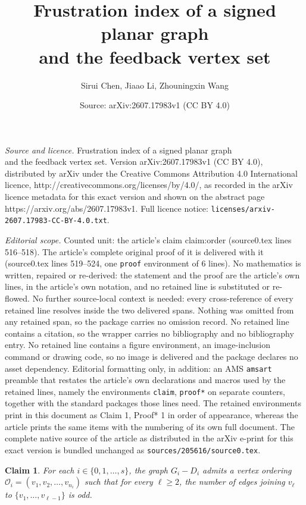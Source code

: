 \documentclass[10pt,a4paper]{amsart}
\title{Frustration index of a signed planar graph \\ and the feedback vertex set}
\author{Sirui Chen, Jiaao Li, Zhouningxin Wang}
\date{Source: arXiv:2607.17983v1 (CC BY 4.0)}
\newtheorem{claim}{Claim}
\begin{document}
\maketitle

\noindent\emph{Source and licence.} Frustration index of a signed planar graph \\ and the feedback vertex set. Version arXiv:2607.17983v1 (CC BY 4.0), distributed by arXiv under the Creative Commons Attribution 4.0 International licence, http://creativecommons.org/licenses/by/4.0/, as recorded in the arXiv licence metadata for this exact version and shown on the abstract page https://arxiv.org/abs/2607.17983v1. Full licence notice: \texttt{licenses/arxiv-2607.17983-CC-BY-4.0.txt}.\par\smallskip

\noindent\textit{Editorial scope.} Counted unit: the article's claim claim:order (source0.tex lines 516--518). The article's complete original proof of it is delivered with it (source0.tex lines 519--524, one \texttt{proof} environment of 6 lines). No mathematics is written, repaired or re-derived: the statement and the proof are the article's own lines, in the article's own notation, and no retained line is substituted or re-flowed.  No further source-local context is needed: every cross-reference of every retained line resolves inside the two delivered spans.  Nothing was omitted from any retained span, so the package carries no omission record.  No retained line contains a citation, so the wrapper carries no bibliography and no bibliography entry.  No retained line contains a figure environment, an image-inclusion command or drawing code, so no image is delivered and the package declares no asset dependency.  Editorial formatting only, in addition: an AMS \texttt{amsart} preamble that restates the article's own declarations and macros used by the retained lines, namely the environments \texttt{claim}, \texttt{proof*} on separate counters, together with the standard packages those lines need.  The retained environments print in this document as Claim 1, Proof* 1 in order of appearance, whereas the article prints the same items with the numbering of its own full document.  The complete native source of the article as distributed in the arXiv e-print for this exact version is bundled unchanged as \texttt{sources/205616/source0.tex}.
\begin{claim}\label{claim:order}
For each $i\in \{0,1,\ldots, s\}$, the graph $G_i-D_i$ admits a vertex ordering $\mathcal{O}_i=(v_1, v_2, \ldots, v_{n_i})$ such that for every $\ell\geq 2$, the number of edges joining $v_\ell$ to $\{v_1,\ldots,v_{\ell-1}\}$ is odd.  
\end{claim}
\end{document}
